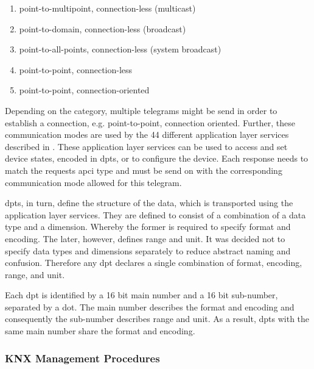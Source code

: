 \begin{enumerate}
	\item point-to-multipoint, connection-less (multicast)
	\item point-to-domain, connection-less (broadcast)
	\item point-to-all-points, connection-less (system broadcast)
	\item point-to-point, connection-less
	\item point-to-point, connection-oriented
\end{enumerate}
\parencite[p.~30]{DIN_EN_50090-4-2}

Depending on the category, multiple telegrams might be send in order to establish a connection, e.g. point-to-point, connection oriented.
Further, these communication modes are used by the 44 different application layer services described in \textcite{DIN_EN_50090-4-1}.
These application layer services can be used to access and set device states, encoded in \glspl{dpt}, or to configure the device.
Each response needs to match the requests \gls{apci} type and must be send on with the corresponding communication mode allowed for this telegram. \parencite[pp.~9--10]{DIN_EN_50090-4-1}

\glspl{dpt}, in turn, define the structure of the data, which is transported using the application layer services.
They are defined to consist of a combination of a data type and a dimension. Whereby the former is required to specify format and encoding. The later, however, defines range and unit.
It was decided not to specify data types and dimensions separately to reduce abstract naming and confusion.
Therefore any \gls{dpt} declares a single combination of format, encoding, range, and unit. \parencite[p.~38]{DIN_EN_50090-3-3}

Each \gls{dpt} is identified by a 16 bit main number and a 16 bit sub-number, separated by a dot. The main number describes the format and encoding and consequently the sub-number describes range and unit. As a result, \glspl{dpt} with the same main number share the format and encoding.







	
\subsubsection{KNX Management Procedures}
\label{sec:background:bas:knx:management}

